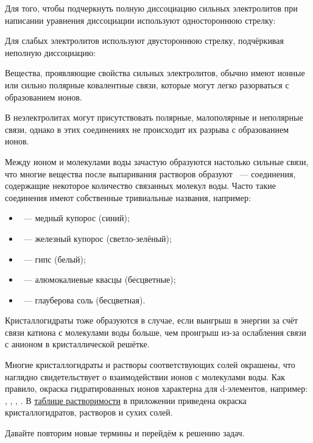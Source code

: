 Для того, чтобы подчеркнуть полную диссоциацию сильных электролитов при написании уравнения диссоциации используют одностороннюю стрелку:


Для слабых электролитов используют двустороннюю стрелку, подчёркивая неполную диссоциацию:


Вещества, проявляющие свойства сильных электролитов, обычно имеют ионные или сильно полярные ковалентные связи, которые могут легко разорваться с образованием ионов.

В неэлектролитах могут присутствовать полярные, малополярные и неполярные связи, однако в этих соединениях не происходит их разрыва с образованием ионов.

Между ионом и молекулами воды зачастую образуются настолько сильные связи, что многие вещества после выпаривания растворов образуют ~--- соединения, содержащие некоторое количество связанных молекул воды. Часто такие соединения имеют собственные тривиальные названия, например:

\begin{itemize}
    \item {}~--- медный купорос (синий);
    \item {}~--- железный купорос (светло-зелёный);
    \item {}~--- гипс (белый);
    \item {}~--- алюмокалиевые квасцы (бесцветные);
    \item {}~--- глауберова соль (бесцветная).
\end{itemize}

Кристаллогидраты тоже образуются в случае, если выигрыш в энергии за счёт связи катиона с молекулами воды больше, чем проигрыш из-за ослабления связи с анионом в кристаллической решётке.

Многие кристаллогидраты и растворы соответствующих солей окрашены, что наглядно свидетельствует о взаимодействии ионов с молекулами воды. Как правило, окраска гидратированных ионов характерна для d-элементов, например: , , , . В \hyperref[appendix:table_of_solubility_of_salts]{таблице растворимости} в приложении приведена окраска кристаллогидратов, растворов и сухих солей.

Давайте повторим новые термины и перейдём к решению задач.


